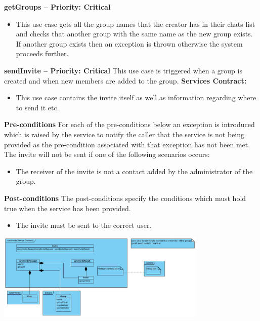 \documentclass[11pt]{article}
\begin{document}
 \textbf{getGroups  – Priority: Critical} \newline
 \begin{itemize}
\item	This use case gets all the group names that the creator has in their chats list and checks that another group with the same name as the new group exists. If another group exists then an exception is thrown otherwise the system proceeds further. \newline
\end{itemize}
 \textbf{sendInvite – Priority: Critical} \newline
 This use case is triggered when a group is created and when new members are added to the group.  \newline 
\textbf{Services Contract:}
 \begin{itemize}
 \item	This use case contains the invite itself as well as information regarding where to send it etc.\newline
 \end{itemize}
\textbf{Pre-conditions} \newline
 For each of the pre-conditions below an exception is introduced which is raised by the service to notify the caller that the service is not being provided as the pre-condition associated with that exception has not been met.\newline
 The invite will not be sent if one of the following scenarios occurs:
 \begin{itemize}
 \item	The receiver of the invite is not a contact added by the administrator of the group.
 \end{itemize}
\textbf{Post-conditions} \newline
 The post-conditions specify the conditions which must hold true when the service has been provided.
 \begin{itemize}
\item	The invite must be sent to the correct user.
\end{itemize}
 \includegraphics[width=380px]{./images/serviceContract-sendInvite.jpg} \newline
\end{document}

